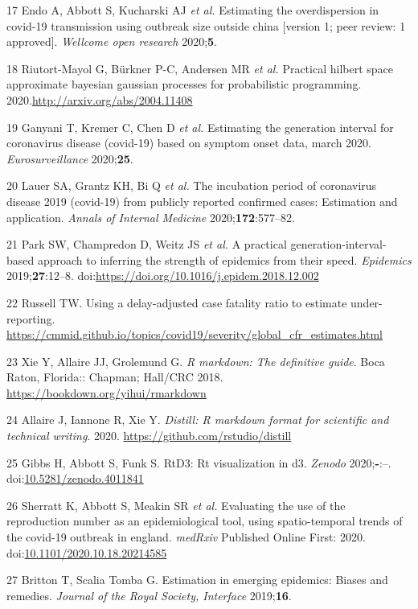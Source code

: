 \documentclass[
]{article}
\begin{document}
\leavevmode\hypertarget{ref-10.12688ux2fwellcomeopenres.15842.1}{}%
17 Endo A, Abbott S, Kucharski AJ \emph{et al.} Estimating the
overdispersion in covid-19 transmission using outbreak size outside
china {[}version 1; peer review: 1 approved{]}. \emph{Wellcome open
research} 2020;\textbf{5}.

\leavevmode\hypertarget{ref-approxGP}{}%
18 Riutort-Mayol G, Bürkner P-C, Andersen MR \emph{et al.} Practical
hilbert space approximate bayesian gaussian processes for probabilistic
programming. 2020.\url{http://arxiv.org/abs/2004.11408}

\leavevmode\hypertarget{ref-generationinterval}{}%
19 Ganyani T, Kremer C, Chen D \emph{et al.} Estimating the generation
interval for coronavirus disease (covid-19) based on symptom onset data,
march 2020. \emph{Eurosurveillance} 2020;\textbf{25}.

\leavevmode\hypertarget{ref-incubationperiod}{}%
20 Lauer SA, Grantz KH, Bi Q \emph{et al.} The incubation period of
coronavirus disease 2019 (covid-19) from publicly reported confirmed
cases: Estimation and application. \emph{Annals of Internal Medicine}
2020;\textbf{172}:577--82.

\leavevmode\hypertarget{ref-Park2019}{}%
21 Park SW, Champredon D, Weitz JS \emph{et al.} A practical
generation-interval-based approach to inferring the strength of
epidemics from their speed. \emph{Epidemics} 2019;\textbf{27}:12--8.
doi:\href{https://doi.org/https://doi.org/10.1016/j.epidem.2018.12.002}{https://doi.org/10.1016/j.epidem.2018.12.002}

\leavevmode\hypertarget{ref-Russell:BFVkJ6lQ}{}%
22 Russell TW. Using a delay-adjusted case fatality ratio to estimate
under-reporting.
\url{https://cmmid.github.io/topics/covid19/severity/global_cfr_estimates.html}

\leavevmode\hypertarget{ref-rmarkdown}{}%
23 Xie Y, Allaire JJ, Grolemund G. \emph{R markdown: The definitive
guide}. Boca Raton, Florida:: Chapman; Hall/CRC 2018.
\url{https://bookdown.org/yihui/rmarkdown}

\leavevmode\hypertarget{ref-distill}{}%
24 Allaire J, Iannone R, Xie Y. \emph{Distill: R markdown format for
scientific and technical writing}. 2020.
\url{https://github.com/rstudio/distill}

\leavevmode\hypertarget{ref-rtd3}{}%
25 Gibbs H, Abbott S, Funk S. RtD3: Rt visualization in d3.
\emph{Zenodo} 2020;\textbf{-}:--.
doi:\href{https://doi.org/10.5281/zenodo.4011841}{10.5281/zenodo.4011841}

\leavevmode\hypertarget{ref-rt-comparison}{}%
26 Sherratt K, Abbott S, Meakin SR \emph{et al.} Evaluating the use of
the reproduction number as an epidemiological tool, using
spatio-temporal trends of the covid-19 outbreak in england.
\emph{medRxiv} Published Online First: 2020.
doi:\href{https://doi.org/10.1101/2020.10.18.20214585}{10.1101/2020.10.18.20214585}

\leavevmode\hypertarget{ref-Britton:2019gf}{}%
27 Britton T, Scalia Tomba G. Estimation in emerging epidemics: Biases
and remedies. \emph{Journal of the Royal Society, Interface}
2019;\textbf{16}.
\end{document}
